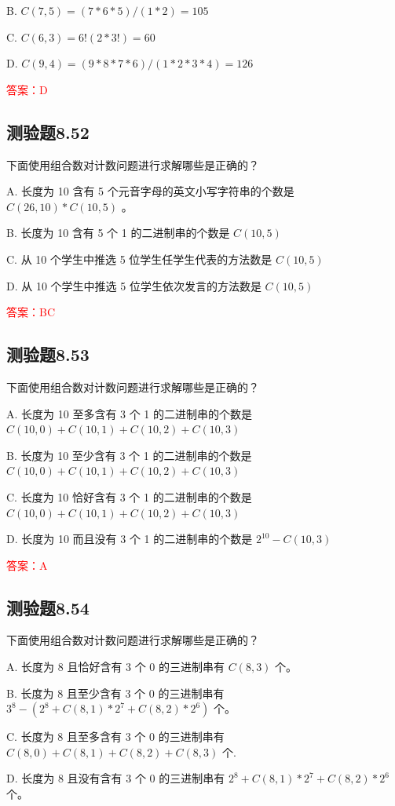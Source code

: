 \documentclass[UTF8, heading=true]{ctexart}
\begin{document}
B. $C(7,5)=(7 * 6 * 5) /(1 * 2)=105$

C. $C(6,3)=6!(2 * 3!)=60$

D. $C(9,4)=\left(9 * 8 * 7 * 6\right) /(1 * 2 * 3 * 4)=126$

\textcolor{red}{答案：D}

\subsection{测验题8.52}
下面使用组合数对计数问题进行求解哪些是正确的？

A. 长度为 10 含有 5 个元音字母的英文小写字符串的个数是 $C(26,10) * C(10,5)$ 。

B. 长度为 10 含有 5 个 1 的二进制串的个数是 $C(10,5)$

C. 从 10 个学生中推选 5 位学生任学生代表的方法数是 $C(10,5)$

D. 从 10 个学生中推选 5 位学生依次发言的方法数是 $C(10,5)$

\textcolor{red}{答案：BC}

\subsection{测验题8.53}

下面使用组合数对计数问题进行求解哪些是正确的？

A. 长度为 10 至多含有 3 个 1 的二进制串的个数是 $C(10,0)+C(10,1)+C(10,2)+C(10,3)$

B. 长度为 10 至少含有 3 个 1 的二进制串的个数是 $C(10,0)+C(10,1)+C(10,2)+C(10,3)$

C. 长度为 10 恰好含有 3 个 1 的二进制串的个数是 $C(10,0)+C(10,1)+C(10,2)+C(10,3)$

D. 长度为 10 而且没有 3 个 1 的二进制串的个数是 $2^{10}-C(10,3)$

\textcolor{red}{答案：A}

\subsection{测验题8.54}
下面使用组合数对计数问题进行求解哪些是正确的？

A. 长度为 8 且恰好含有 3 个 0 的三进制串有 $C(8,3)$ 个。

B. 长度为 8 且至少含有 3 个 0 的三进制串有 $3^8-\left(2^8+C(8,1) * 2^7+C(8,2) * 2^6\right)$ 个。

C. 长度为 8 且至多含有 3 个 0 的三进制串有 $C(8,0)+C(8,1)+C(8,2)+C(8,3)$ 个.

D. 长度为 8 且没有含有 3 个 0 的三进制串有 $2^8+C(8,1) * 2^7+C(8,2) * 2^6$ 个。
\end{document}
